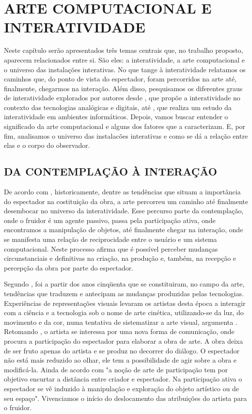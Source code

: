 \chapter{ARTE COMPUTACIONAL E INTERATIVIDADE}

Neste capítulo serão apresentados três temas centrais que, no trabalho proposto, aparecem relacionados entre si. São eles: a interatividade, a arte computacional e o universo das instalações interativas. No que tange à interatividade relatamos os caminhos que, do ponto de vista do espectador, foram percorridos na arte até, finalmente, chegarmos na interação. Além disso, pesquisamos os diferentes graus de interatividade explorados por autores desde , que propõe a interatividade no contexto das tecnologias analógicas e digitais, até  , que realiza um estudo da interatividade em ambientes informáticos. Depois, vamos buscar entender o significado da arte computacional e alguns dos fatores que a caracterizam. E, por fim, analisamos o universo das instalacões interativas e como se dá a relação entre elas e o corpo do observador.




\section{DA CONTEMPLAÇÃO À INTERAÇÃO}

De acordo com , historicamente, dentre as tendências que situam a importância do espectador na costituição da obra, a arte percorreu um caminho até finalmente desembocar no universo da interatividade. Esse percurso parte da contemplação, onde o fruidor é um agente passivo, passa pela participação ativa, onde encontramos a manipulação de objetos, até finalmente chegar na interação, onde se manifesta uma relação de reciprocidade entre o usuário e um sistema computacional. Neste processo  afirma que é possível perceber mudanças circunstanciais e definitivas na criação, na produção e, também, na recepção e percepção da obra por parte do espectador. 

Segundo , foi a partir dos anos cinqüenta que se constituiram, no campo da arte, tendências que traduzem e antecipam as mudanças produzidas pelas tecnologias. Experiências de representações visuais levaram os artistas desta época a interagir com a ciência e a tecnologia sob o nome de arte cinética, utilizando-se da luz, do movimento e da cor, numa tentativa de sistematizar a arte visual, argumenta . Retomando , o artista se interessa por uma nova forma de comunicação, onde procura a participação do espectador para elaborar a obra de arte. A obra deixa de ser fruto apenas do artista e se produz no decorrer do diálogo. O espectador não está mais reduzido ao olhar, ele tem a possibilidade de agir sobre a obra e modificá-la. Ainda de acordo com  "a noção de arte de participação tem por objetivo encurtar a distância entre criador e espectador. Na participação ativa o espectador se vê induzido à manipulação e exploração do objeto artístico ou de seu espaço". Vivenciamos o início do deslocamento das atribuições do artista para o fruidor. 

